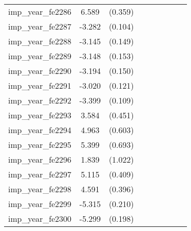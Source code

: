 {\begin{tabular}{l*{4}{cc}}
imp\_year\_fe2286&    6.589\sym{***}&  (0.359)&                  &         &                  &         &                  &         \\
imp\_year\_fe2287&   -3.282\sym{***}&  (0.104)&                  &         &                  &         &                  &         \\
imp\_year\_fe2288&   -3.145\sym{***}&  (0.149)&                  &         &                  &         &                  &         \\
imp\_year\_fe2289&   -3.148\sym{***}&  (0.153)&                  &         &                  &         &                  &         \\
imp\_year\_fe2290&   -3.194\sym{***}&  (0.150)&                  &         &                  &         &                  &         \\
imp\_year\_fe2291&   -3.020\sym{***}&  (0.121)&                  &         &                  &         &                  &         \\
imp\_year\_fe2292&   -3.399\sym{***}&  (0.109)&                  &         &                  &         &                  &         \\
imp\_year\_fe2293&    3.584\sym{***}&  (0.451)&                  &         &                  &         &                  &         \\
imp\_year\_fe2294&    4.963\sym{***}&  (0.603)&                  &         &                  &         &                  &         \\
imp\_year\_fe2295&    5.399\sym{***}&  (0.693)&                  &         &                  &         &                  &         \\
imp\_year\_fe2296&    1.839         &  (1.022)&                  &         &                  &         &                  &         \\
imp\_year\_fe2297&    5.115\sym{***}&  (0.409)&                  &         &                  &         &                  &         \\
imp\_year\_fe2298&    4.591\sym{***}&  (0.396)&                  &         &                  &         &                  &         \\
imp\_year\_fe2299&   -5.315\sym{***}&  (0.210)&                  &         &                  &         &                  &         \\
imp\_year\_fe2300&   -5.299\sym{***}&  (0.198)&                  &         &                  &         &                  &         \\

\end{tabular}}
